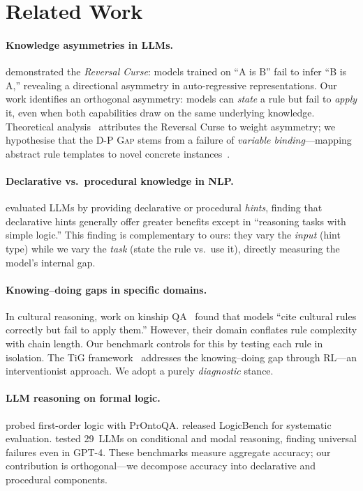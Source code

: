 \documentclass[11pt]{article}
\newcommand{\dpgap}{\textsc{D-P Gap}}
\begin{document}
\section{Related Work}
\label{sec:related}

\paragraph{Knowledge asymmetries in LLMs.}
\citet{berglund2024reversal} demonstrated the \emph{Reversal Curse}:
models trained on ``A is B'' fail to infer ``B is A,'' revealing a
directional asymmetry in auto-regressive representations.
Our work identifies an orthogonal asymmetry: models can \emph{state}
a rule but fail to \emph{apply} it, even when both capabilities draw
on the same underlying knowledge.
Theoretical analysis~\cite{wu2024reversal} attributes the Reversal
Curse to weight asymmetry; we hypothesise that the \dpgap{} stems
from a failure of \emph{variable binding}---mapping abstract rule
templates to novel concrete instances~\cite{greff2020binding}.

\paragraph{Declarative vs.\ procedural knowledge in NLP.}
\citet{li2024metacognitive} evaluated LLMs by providing declarative
or procedural \emph{hints}, finding that declarative hints generally
offer greater benefits except in ``reasoning tasks with simple logic.''
This finding is complementary to ours: they vary the \emph{input}
(hint type) while we vary the \emph{task} (state the rule vs.\ use
it), directly measuring the model's internal gap.

\paragraph{Knowing--doing gaps in specific domains.}
In cultural reasoning, work on kinship QA~\cite{kinshipqa2026}
found that models ``cite cultural rules correctly but fail to apply
them.''
However, their domain conflates rule complexity with chain length.
Our benchmark controls for this by testing each rule in isolation.
The TiG framework~\cite{liao2025tig} addresses the knowing--doing
gap through RL---an interventionist approach.
We adopt a purely \emph{diagnostic} stance.

\paragraph{LLM reasoning on formal logic.}
\citet{saparov2023prontoqa} probed first-order logic with PrOntoQA.
\citet{xu2024logicbench} released LogicBench for systematic evaluation.
\citet{hopp2024conditional} tested 29~LLMs on conditional and modal
reasoning, finding universal failures even in GPT-4.
These benchmarks measure aggregate accuracy; our contribution is
orthogonal---we decompose accuracy into declarative and procedural
components.
\end{document}
